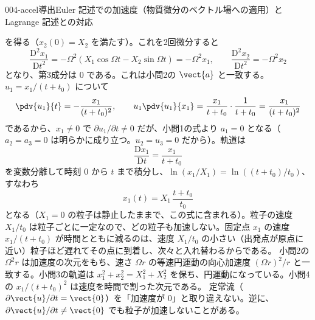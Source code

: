\documentclass[uplatex,dvipdfmx,a4paper,11pt]{jsarticle}
\begin{document}
\begin{mondai}{004-accel}{導出}{Euler 記述での加速度（物質微分のベクトル場への適用）と Lagrange 記述との対応}
\begin{tadashii}
を得る（$x_2(0) = X_2$ を満たす）。これを2回微分すると
\[ \frac{\mathrm{D}^{2}x_1}{\mathrm{D}t^{2}} = -\Omega^{2}(X_1\cos\Omega t - X_2\sin\Omega t) = -\Omega^{2}x_1,\qquad \frac{\mathrm{D}^{2}x_2}{\mathrm{D}t^{2}} = -\Omega^{2}x_2 \]
となり、第3成分は 0 である。これは小問2の $\vect{a}$ と一致する。
 $u_1 = x_1/(t+t_0)$ について
\[ \pdv{u_1}{t} = -\frac{x_1}{(t+t_0)^{2}},\qquad u_1\pdv{u_1}{x_1} = \frac{x_1}{t+t_0}\cdot\frac{1}{t+t_0} = \frac{x_1}{(t+t_0)^{2}} \]
であるから、$x_1 \neq 0$ で $\partial u_1/\partial t \neq 0$ だが、小問1の式より $a_1 = 0$ となる（$a_2 = a_3 = 0$ は明らかに成り立つ。$u_2 = u_3 = 0$ だから）。軌道は
\[ \frac{\mathrm{D}x_1}{\mathrm{D}t} = \frac{x_1}{t+t_0} \]
を変数分離して時刻 0 から $t$ まで積分し、$\ln(x_1/X_1) = \ln((t+t_0)/t_0)$、すなわち
\[ x_1(t) = X_1\,\frac{t+t_0}{t_0} \]
となる（$X_1 = 0$ の粒子は静止したままで、この式に含まれる）。粒子の速度 $X_1/t_0$ は粒子ごとに一定なので、どの粒子も加速しない。固定点 $x_1$ の速度 $x_1/(t+t_0)$ が時間とともに減るのは、速度 $X_1/t_0$ の小さい（出発点が原点に近い）粒子ほど遅れてその点に到着し、次々と入れ替わるからである。
\kenzan 小問2の $\Omega^{2}r$ は加速度の次元をもち、速さ $\Omega r$ の等速円運動の向心加速度 $(\Omega r)^{2}/r$ と一致する。小問3の軌道は $x_1^{2}+x_2^{2} = X_1^{2}+X_2^{2}$ を保ち、円運動になっている。小問4の $x_1/(t+t_0)^{2}$ は速度を時間で割った次元である。
\tsumazuki 定常流（$\partial\vect{u}/\partial t = \vect{0}$）を「加速度が 0」と取り違えない。逆に、$\partial\vect{u}/\partial t \neq \vect{0}$ でも粒子が加速しないことがある。
\end{tadashii}
\end{mondai}
\end{document}
